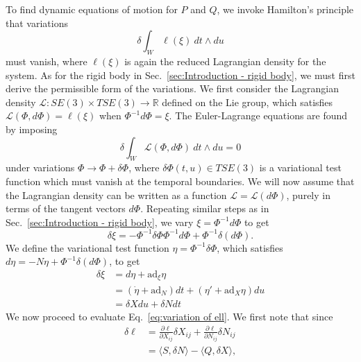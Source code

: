 To find dynamic equations of motion for $P$ and $Q$, we invoke Hamilton's principle that variations
\begin{equation} \label{eq:variation of ell}
\delta \int_W \ell(\xi)\ dt \wedge du
\end{equation}
must vanish, where $\ell(\xi)$ is again the reduced Lagrangian density for the system. As for the rigid body in Sec.~\ref{sec:Introduction - rigid body}, we must first derive the permissible form of the variations. We first consider the Lagrangian density $\mathcal{L} : SE(3) \times TSE(3) \to \mathbb{R}$ defined on the Lie group, which satisfies $\mathcal{L}(\Phi, d \Phi) = \ell(\xi)$ when $\Phi^{-1} d \Phi = \xi$. The Euler-Lagrange equations are found by imposing
\begin{equation} \label{eq:hamiltons principle}
\delta \int_W \mathcal{L}(\Phi, d \Phi)\ dt \wedge du = 0
\end{equation}
under variations $\Phi \to \Phi + \delta \Phi$, where $\delta \Phi(t,u) \in TSE(3)$ is a variational test function which must vanish at the temporal boundaries. We will now assume that the Lagrangian density can be written as a function $\mathcal{L} = \mathcal{L}(d \Phi)$, purely in terms of the tangent vectors $d \Phi$. Repeating similar steps as in Sec.~\ref{sec:Introduction - rigid body}, we vary $\xi = \Phi^{-1} d \Phi$ to get
\begin{equation}
\delta \xi = - \Phi^{-1} \delta \Phi \Phi^{-1} d \Phi + \Phi^{-1} \delta (d \Phi).
\end{equation}
We define the variational test function $\eta = \Phi^{-1} \delta \Phi$, which satisfies $d \eta = - N \eta + \Phi^{-1} \delta (d \Phi)$, to get
\begin{equation}
\begin{aligned}
\delta \xi & = d \eta + \text{ad}_\xi \eta \\
& = (\dot{\eta} + \text{ad}_N ) dt + (\eta' + \text{ad}_X \eta) du \\
& = \delta X du + \delta N dt
\end{aligned}
\end{equation}
We now proceed to evaluate Eq.~\ref{eq:variation of ell}. We first note that since
\begin{equation}
\begin{aligned}
\delta \ell & = \frac{\partial \ell}{\partial X_{ij}} \delta X_{ij} + \frac{\partial \ell}{\partial N_{ij}} \delta N_{ij} \\ 
& = \langle S, \delta N \rangle  - \langle Q, \delta X \rangle,
\end{aligned} 
\end{equation}
